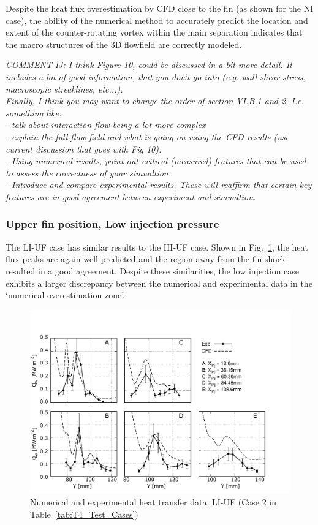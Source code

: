 \documentclass{AIAA}
\begin{document}
Despite the heat flux overestimation by CFD close to the fin (as shown for the NI case), the ability of the numerical method to accurately predict the location and extent of the counter-rotating vortex within the main separation indicates that the macro structures of the 3D flowfield are correctly modeled.

{\it COMMENT IJ: I think Figure 10, could be discussed in a bit more detail. It includes a lot of good information, that you don't go into (e.g. wall shear stress, macroscopic streaklines, etc...). \\ 
Finally, I think you may want to change the order of section VI.B.1 and 2. I.e. something like:\\
- talk about interaction flow being a lot more complex\\
- explain the full flow field and what is going on using the CFD results (use current discussion that goes with Fig 10).\\ 
- Using numerical results, point out critical (measured) features that can be used to assess the correctness of your simualtion \\
- Introduce and compare experimental results. These will reaffirm that certain key features are in good agreement between experiment and simualtion.
}


\subsubsection{Upper fin position, Low injection pressure}

The LI-UF case has similar results to the HI-UF case. 
Shown in Fig.~\ref{fig:HeatFluxLPLIUF}, the heat flux peaks are again well predicted and the region away from the fin shock resulted in a good agreement.
Despite these similarities, the low injection case exhibits a larger discrepancy between the numerical and experimental data in the `numerical overestimation zone'. 


\begin{figure}[!h]
\center
\includegraphics[trim = 0mm 3mm 25mm 25mm, clip, width=0.60\columnwidth,valign=t,fbox]{Figures/Data/LP_LI_UF/GNUP_CFD_GaugesLines_Multi.pdf}
\caption{Numerical and experimental heat transfer data. LI-UF (Case 2 in Table~\ref{tab:T4_Test_Cases})}
\label{fig:HeatFluxLPLIUF}
\end{figure} 
%
\end{document}
